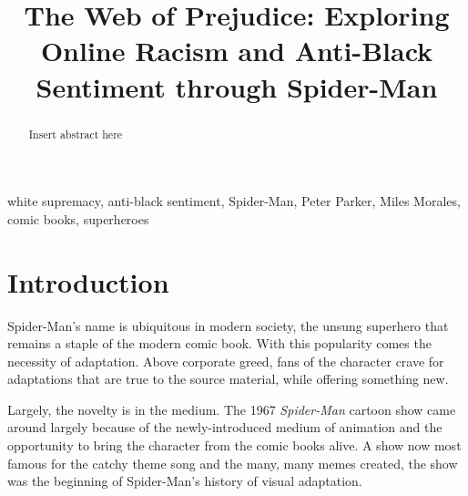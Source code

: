 \documentclass[conference]{IEEEtran}
\begin{document}

\title{The Web of Prejudice: Exploring Online Racism and Anti-Black Sentiment through Spider-Man}
\author{
\and
{}
\and
{}
}
%
\maketitle             %
%

\begin{abstract}
Insert abstract here
\end{abstract}

\begin{IEEEkeywords}
white supremacy, anti-black sentiment, Spider-Man, Peter Parker, Miles Morales, comic books, superheroes
 \end{IEEEkeywords}


\section{Introduction}

Spider-Man's name is ubiquitous in modern society, the unsung superhero that remains a staple of the modern comic book. With this popularity comes the necessity of adaptation. Above corporate greed, fans of the character crave for adaptations that are true to the source material, while offering something new. 

Largely, the novelty is in the medium. The 1967 \textit{Spider-Man} cartoon show came around largely because of the newly-introduced medium of animation and the opportunity to bring the character from the comic books alive. A show now most famous for the catchy theme song and the many, many memes created, the show was the beginning of Spider-Man's history of visual adaptation.
\end{document}
